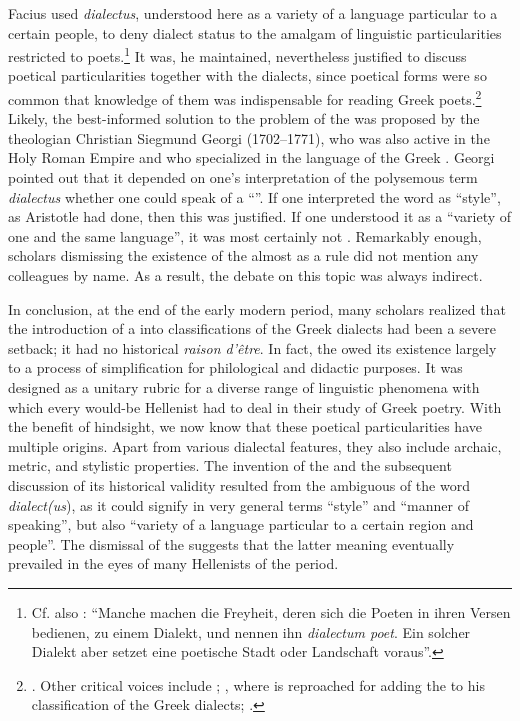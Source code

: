 Facius used \textit{dialectus}, understood here as a variety of a language particular to a certain people, to deny dialect status to the amalgam of linguistic particularities restricted to poets.\footnote{Cf. also \citet[67]{Haas1780}: “Manche machen die Freyheit, deren sich die Poeten in ihren Versen bedienen, zu einem Dialekt, und nennen ihn \textit{dialectum poet}. Ein solcher Dialekt aber setzet eine poetische Stadt oder Landschaft voraus”.} It was, he maintained, nevertheless justified to discuss poetical particularities together with the dialects, since poetical forms were so common that knowledge of them was indispensable for reading Greek poets.\footnote{\citet[98]{Facius1782}. Other critical voices include \citet[\textsc{a.3}\textsc{\textsuperscript{v}}]{Bolius1689}; \citet[\textsc{d.2}\textsc{\textsuperscript{v}}]{Thryllitsch1709}, where \citet[147]{Reyher1634} is reproached for adding the  to his classification of the Greek dialects; \citet[136--167]{Walch1772}.} Likely, the best-informed solution to the problem of the  was proposed by the theologian Christian Siegmund Georgi (1702–1771), who was also active in the Holy Roman Empire and who specialized in the language of the Greek . Georgi pointed out that it depended on one’s interpretation of the polysemous term \textit{dialectus} whether one could speak of a “”. If one interpreted the word as “style”, as Aristotle had done, then this was justified. If one understood it as a “variety of one and the same language”, it was most certainly not \citep[169]{Georgi1733}. Remarkably enough, scholars dismissing the existence of the  almost as a rule did not mention any colleagues by name. As a result, the debate on this topic was always indirect.

In conclusion, at the end of the early modern period, many scholars realized that the introduction of a  into classifications of the Greek dialects had been a severe setback; it had no historical \textit{raison d’être}. In fact, the  owed its existence largely to a process of simplification for philological and didactic purposes. It was designed as a unitary rubric for a diverse range of linguistic phenomena with which every would-be Hellenist had to deal in their study of Greek poetry. With the benefit of hindsight, we now know that these poetical particularities have multiple origins. Apart from various dialectal features, they also include archaic, metric, and stylistic properties. The invention of the  and the subsequent discussion of its historical validity resulted from the ambiguous  of the word \textit{dialect(us}), as it could signify in very general terms “style” and “manner of speaking”, but also “variety of a language particular to a certain region and people”. The dismissal of the  suggests that the latter meaning eventually prevailed in the eyes of many Hellenists of the period.

